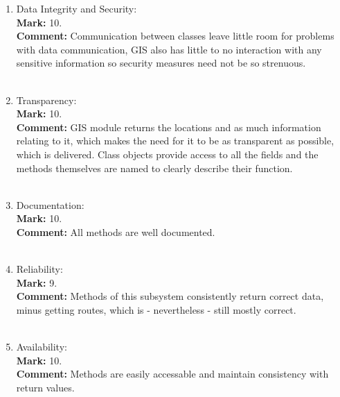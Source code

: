 \documentclass{article}
\begin{document}
\begin{enumerate}
    \item Data Integrity and Security:\\
    \textbf{Mark: }
    10.\\
    \textbf{Comment:}
    Communication between classes leave little room for problems with data communication, GIS also has little to no interaction with any sensitive information so security measures need not be so strenuous.\\ \\
    
    \item Transparency:\\
    \textbf{Mark: }
    10.\\
    \textbf{Comment:}
    GIS module returns the locations and as much information relating to it, which makes the need for it to be as transparent as possible, which is delivered. Class objects provide access to all the fields and the methods themselves are named to clearly describe their function.\\ \\
    
    \item Documentation:\\
    \textbf{Mark: }
    10.\\
    \textbf{Comment:}
    All methods are well documented.\\ \\
    
    \item Reliability:\\
    \textbf{Mark: }
    9.\\
    \textbf{Comment:}
    Methods of this subsystem consistently return correct data, minus getting routes, which is - nevertheless - still mostly correct.\\ \\
    
    \item Availability:\\
    \textbf{Mark: }
    10.\\
    \textbf{Comment:}
    Methods are easily accessable and maintain consistency with return values.\\ \\
\end{enumerate}
\end{document}
